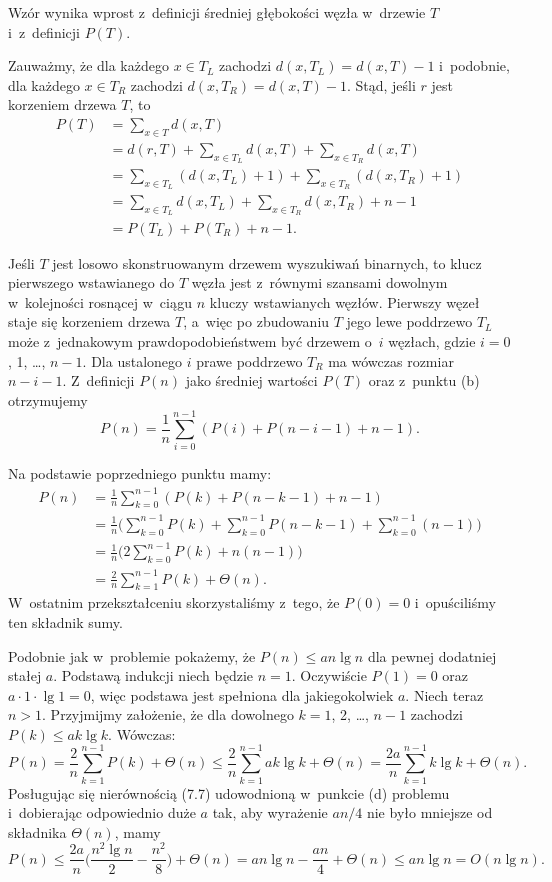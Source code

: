 \subproblem %
Wzór wynika wprost z~definicji średniej głębokości węzła w~drzewie $T$ i~z~definicji $P(T)$.

\subproblem %
Zauważmy, że dla każdego $x\in T_L$ zachodzi $d(x,T_L)=d(x,T)-1$ i~podobnie, dla każdego $x\in T_R$ zachodzi $d(x,T_R)=d(x,T)-1$.
Stąd, jeśli $r$ jest korzeniem drzewa $T$, to
\begin{align*}
	P(T) &= \sum_{x\in T}d(x,T) \\
	&= d(r,T)+\sum_{x\in T_L}d(x,T)+\sum_{x\in T_R}d(x,T) \\[1mm]
	&= \sum_{x\in T_L}(d(x,T_L)+1)+\sum_{x\in T_R}(d(x,T_R)+1) \\[1mm]
	&= \sum_{x\in T_L}d(x,T_L)+\sum_{x\in T_R}d(x,T_R)+n-1 \\[1mm]
	&= P(T_L)+P(T_R)+n-1.
\end{align*}

\subproblem %
Jeśli $T$ jest losowo skonstruowanym drzewem wyszukiwań binarnych, to klucz pierwszego wstawianego do $T$ węzła jest z~równymi szansami dowolnym w~kolejności rosnącej w~ciągu $n$ kluczy wstawianych węzłów.
Pierwszy węzeł staje się korzeniem drzewa $T$, a~więc po zbudowaniu $T$ jego lewe poddrzewo $T_L$ może z~jednakowym prawdopodobieństwem być drzewem o~$i$ węzłach, gdzie $i=0$, 1, \dots, $n-1$.
Dla ustalonego $i$ prawe poddrzewo $T_R$ ma wówczas rozmiar $n-i-1$.
Z~definicji $P(n)$ jako średniej wartości $P(T)$ oraz z~punktu (b) otrzymujemy
\[
	P(n) = \frac{1}{n}\sum_{i=0}^{n-1}(P(i)+P(n-i-1)+n-1).
\]

\subproblem %
Na podstawie poprzedniego punktu mamy:
\begin{align*}
	P(n) &= \frac{1}{n}\sum_{k=0}^{n-1}(P(k)+P(n-k-1)+n-1) \\
	&= \frac{1}{n}\biggl(\sum_{k=0}^{n-1}P(k)+\sum_{k=0}^{n-1}P(n-k-1)+\sum_{k=0}^{n-1}(n-1)\biggr) \\
	&= \frac{1}{n}\biggl(2\sum_{k=0}^{n-1}P(k)+n(n-1)\biggr) \\
	&= \frac{2}{n}\sum_{k=1}^{n-1}P(k)+\Theta(n).
\end{align*}
W~ostatnim przekształceniu skorzystaliśmy z~tego, że $P(0)=0$ i~opuściliśmy ten składnik sumy.

\subproblem %
Podobnie jak w~problemie  pokażemy, że $P(n)\le an\lg n$ dla pewnej dodatniej stałej $a$.
Podstawą indukcji niech będzie $n=1$.
Oczywiście $P(1)=0$ oraz $a\cdot1\cdot\lg1=0$, więc podstawa jest spełniona dla jakiegokolwiek $a$.
Niech teraz $n>1$.
Przyjmijmy założenie, że dla dowolnego $k=1$, 2, \dots, $n-1$ zachodzi $P(k)\le ak\lg k$.
Wówczas:
\[
	P(n) = \frac{2}{n}\sum_{k=1}^{n-1}P(k)+\Theta(n) \le \frac{2}{n}\sum_{k=1}^{n-1}ak\lg k+\Theta(n) = \frac{2a}{n}\sum_{k=1}^{n-1}{k\lg k}+\Theta(n).
\]
Posługując się nierównością (7.7) udowodnioną w~punkcie (d) problemu  i~dobierając odpowiednio duże $a$ tak, aby wyrażenie $an/4$ nie było mniejsze od składnika $\Theta(n)$, mamy
\[
	P(n) \le \frac{2a}{n}\biggl(\frac{n^2\lg n}{2}-\frac{n^2}{8}\biggr)+\Theta(n) = an\lg n-\frac{an}{4}+\Theta(n) \le an\lg n = O(n\lg n).
\]

